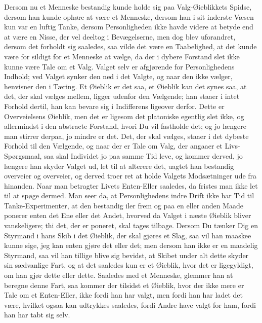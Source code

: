 \documentclass[12pt,a4paper]{article}
\begin{document}
Dersom nu et Menneske bestandig kunde holde sig paa Valg-Øieblikkets Spidse, dersom han kunde ophøre at være et Menneske, dersom han i sit inderste Væsen kun var en luftig Tanke, dersom Personligheden ikke havde videre at betyde end at være en Nisse, der vel deeltog i Bevægelserne, men dog blev uforandret, dersom det forholdt sig saaledes, saa vilde det være en Taabelighed, at det kunde være for sildigt for et Menneske at vælge, da der i dybere Forstand slet ikke kunne være Tale om et Valg. Valget selv er afgjørende for Personlighedens Indhold; ved Valget synker den ned i det Valgte, og naar den ikke vælger, henvisner den i Tæring. Et Øieblik er det saa, et Øieblik kan det synes saa, at det, der skal vælges mellem, ligger udenfor den Vælgende; han staaer i intet Forhold dertil, han kan bevare sig i Indifferens ligeover derfor. Dette er Overveielsens Øieblik, men det er ligesom det platoniske egentlig slet ikke, og allermindst i den abstracte Forstand, hvori Du vil fastholde det; og jo længere man stirrer derpaa, jo mindre er det. Det, der skal vælges, staaer i det dybeste Forhold til den Vælgende, og naar der er Tale om Valg, der angaaer et Livs-Spørgsmaal, saa skal Individet jo paa samme Tid leve, og kommer derved, jo længere han skyder Valget ud, let til at alterere det, uagtet han bestandig overveier og overveier, og derved troer ret at holde Valgets Modsætninger ude fra hinanden. Naar man betragter Livets Enten-Eller saaledes, da fristes man ikke let til at spøge dermed. Man seer da, at Personlighedens indre Drift ikke har Tid til Tanke-Experimenter, at den bestandig iler frem og paa en eller anden Maade ponerer enten det Ene eller det Andet, hvorved da Valget i næste Øieblik bliver vanskeligere; thi det, der er poneret, skal tages tilbage. Dersom Du tænker Dig en Styrmand i hans Skib i det Øieblik, der skal gjøres et Slag, saa vil han maaskee kunne sige, jeg kan enten gjøre det eller det; men dersom han ikke er en maadelig Styrmand, saa vil han tillige blive sig bevidst, at Skibet under alt dette skyder sin sædvanlige Fart, og at det saaledes kun er et Øieblik, hvor det er ligegyldigt, om han gjør dette eller dette. Saaledes med et Menneske, glemmer han at beregne denne Fart, saa kommer der tilsidst et Øieblik, hvor der ikke mere er Tale om et Enten-Eller, ikke fordi han har valgt, men fordi han har ladet det være, hvilket ogsaa kan udtrykkes saaledes, fordi Andre have valgt for ham, fordi han har tabt sig selv.
\end{document}
